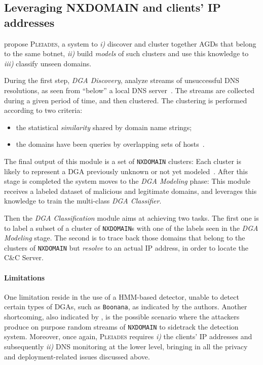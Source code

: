 
\subsection{Leveraging NXDOMAIN and clients' IP addresses} %
\label{sub:pleiades}
\citet{antonakakis2012} propose \textsc{Pleiades}, a system to \emph{i)} discover
and cluster together AGDs that belong to the same botnet, \emph{ii)} build
\emph{models} of such clusters and use this knowledge to \emph{iii)} classify unseen
domains.

During the first step, \emph{DGA Discovery}, \citet{antonakakis2012} analyze streams of
unsuccessful DNS resolutions, as seen from ``below'' a local DNS server~\cite{antonakakis2012}. The streams are collected during a given period of time, and then
clustered. The clustering is performed according to two criteria:
\begin{itemize}
    \item the statistical \emph{similarity} shared by domain name strings;
    \item the domains have been queries by overlapping sets of
        hosts~\cite{antonakakis2012}.
\end{itemize}
The final output of this module is a set of \texttt{NXDOMAIN} clusters: Each cluster is likely
to represent a DGA previously unknown or not yet modeled~\cite{antonakakis2012}.
After this stage is completed the system moves to the \emph{DGA Modeling} phase: This
module receives a labeled dataset of malicious and legitimate domains, and leverages
this knowledge to train the multi-class \emph{DGA Classifier}.

Then the \emph{DGA Classification} module aims at achieving two tasks. The first one
is to label a subset of a cluster of \texttt{NXDOMAIN}s with one of the labels seen in the
\emph{DGA Modeling} stage. The second is to trace back those domains that belong
to the clusters of \texttt{NXDOMAIN} but \emph{resolve} to an actual IP address, in order to
locate the C\&C Server.

\paragraph{Limitations} One limitation reside in the use of a HMM-based detector,
unable to detect certain types of DGAs, such as \texttt{Boonana}, as indicated by
the authors. Another shortcoming, also indicated by \citet{antonakakis2012},
is the possible scenario where the attackers produce on purpose random streams of
\texttt{NXDOMAIN} to sidetrack the detection system.
Moreover, once again, \textsc{Pleiades} requires \emph{i)} the clients' IP addresses
and subsequently \emph{ii)} DNS monitoring at the lower level, bringing in all the
privacy and deployment-related issues discussed above.

